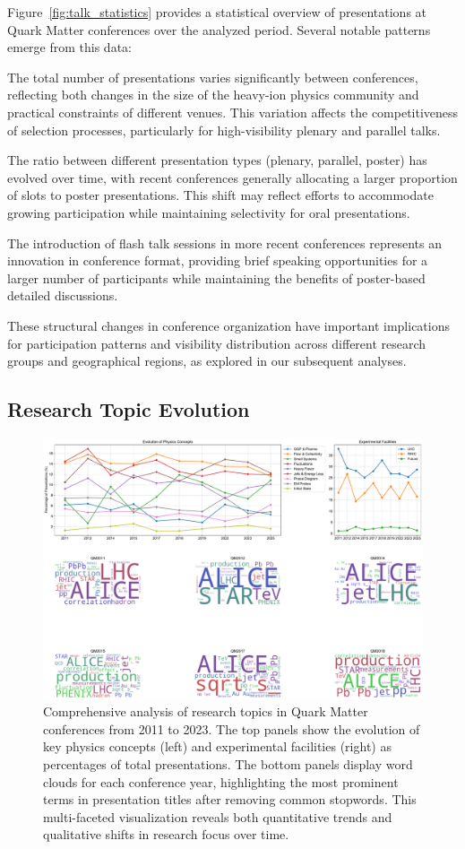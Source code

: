 \documentclass[a4paper,11pt]{article}
\begin{document}
Figure~\ref{fig:talk_statistics} provides a statistical overview of presentations at Quark Matter conferences over the analyzed period. Several notable patterns emerge from this data:

The total number of presentations varies significantly between conferences, reflecting both changes in the size of the heavy-ion physics community and practical constraints of different venues. This variation affects the competitiveness of selection processes, particularly for high-visibility plenary and parallel talks.

The ratio between different presentation types (plenary, parallel, poster) has evolved over time, with recent conferences generally allocating a larger proportion of slots to poster presentations. This shift may reflect efforts to accommodate growing participation while maintaining selectivity for oral presentations.

The introduction of flash talk sessions in more recent conferences represents an innovation in conference format, providing brief speaking opportunities for a larger number of participants while maintaining the benefits of poster-based detailed discussions.

These structural changes in conference organization have important implications for participation patterns and visibility distribution across different research groups and geographical regions, as explored in our subsequent analyses.

\subsection{Research Topic Evolution}

\begin{figure}[H]
\centering
\includegraphics[width=\textwidth]{figures/QM_keyword_analysis.pdf}
\caption{Comprehensive analysis of research topics in Quark Matter conferences from 2011 to 2023. The top panels show the evolution of key physics concepts (left) and experimental facilities (right) as percentages of total presentations. The bottom panels display word clouds for each conference year, highlighting the most prominent terms in presentation titles after removing common stopwords. This multi-faceted visualization reveals both quantitative trends and qualitative shifts in research focus over time.}
\label{fig:keywords}
\end{figure}
\end{document}
